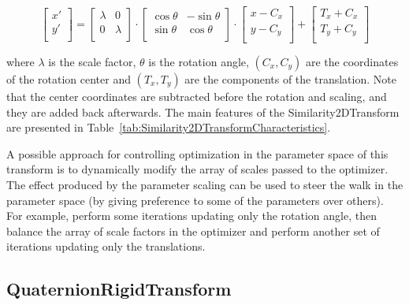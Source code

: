 \begin{equation}
\left[
\begin{array}{c}
x' \\
y' \\
\end{array}
\right]
=
\left[
\begin{array}{cc}
\lambda &    0     \\
   0    &  \lambda \\
\end{array}
\right]
\cdot
\left[
\begin{array}{cc}
\cos{\theta} & -\sin{\theta} \\
\sin{\theta} &  \cos{\theta} \\
\end{array}
\right]
\cdot
\left[
\begin{array}{c}
x - C_x \\
y - C_y \\
\end{array}
\right]
+
\left[
\begin{array}{c}
T_x + C_x \\
T_y + C_y \\
\end{array}
\right]
\end{equation}

where $\lambda$ is the scale factor, $\theta$ is the rotation angle,
$(C_x,C_y)$ are the coordinates of the rotation center and $(T_x,T_y)$ are the
components of the translation. Note that the center coordinates are subtracted
before the rotation and scaling, and they are added back afterwards.  The main
features of the Similarity2DTransform are presented in
Table~\ref{tab:Similarity2DTransformCharacteristics}.


A possible approach for controlling optimization in the parameter space of
this transform is to dynamically modify the array of scales passed to the
optimizer. The effect produced by the parameter scaling can be used to steer
the walk in the parameter space (by giving preference to some of the
parameters over others). For example, perform some iterations updating only
the rotation angle, then balance the array of scale factors in the optimizer
and perform another set of iterations updating only the translations.


\subsection{QuaternionRigidTransform}
\label{sec:QuaternionRigidTransform}

